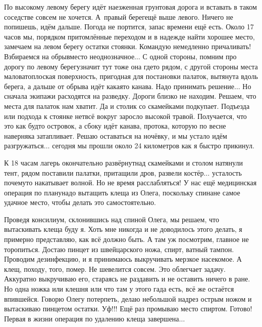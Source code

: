 По высокому левому берегу идёт наезженная грунтовая дорога и вставать в таком соседстве совсем не хочется. А~правый берег\mdash ещё выше левого. Ничего не попишешь, идём дальше. Погода не портится, запас времени ещё есть. Около 17 часов мы, порядком притомлённые переходом и в надежде найти хорошее место, замечаем на левом берегу остатки стоянки. Командую немедленно причаливать! Взбираемся на обрыв\mdash место неоднозначное$\ldots$ С одной стороны, помним про дорогу по левому берегу\mdash значит тут тоже она где\sdash то рядом, с другой стороны места маловато\mdash плоская поверхность, пригодная для постановки палаток, вытянута вдоль берега, а дальше от обрыва идёт какая\sdash то канава. Надо принимать решение$\ldots$ Но сначала экипажи расходятся на разведку. Дороги близко не находим. Решаем, что места для палаток нам хватит. Да и столик со скамейками подкупает. Подъезда или подхода к стоянке нет\mdash всё вокруг заросло высокой травой. Получается, что это как будто островок, а сбоку идёт канава, протока, которую по весне наверняка затапливает. Решаю оставаться на ночёвку, и мы устало идём разгружаться$\ldots$ сегодня мы прошли около 24 километров как я быстро прикинул.

К 18 часам лагерь окончательно развёрнут\mdash над скамейками и столом натянули тент, рядом поставили палатки, притащили дров, развели костёр$\ldots$ усталость почему\sdash то накатывает волной. Но не время расслабляться! У нас ещё медицинская операция по плану\mdash надо вытащить клеща из Олега, поскольку спина\mdash не самое удачное место, чтобы делать это самостоятельно. 

Проведя консилиум, склонившись над спиной Олега, мы решаем, что вытаскивать клеща буду я. Хоть мне никогда и не доводилось этого делать, я примерно представляю, как всё должно быть. А там уж посмотрим, главное не торопиться. Достаю пинцет из швейцарского ножа, спирт, ватный тампон. Проводим дезинфекцию, и я принимаюсь выкручивать мерзкое насекомое. А клещ, походу, того, помер. Не шевелится совсем. Это облегчает задачу. Аккуратно выкручиваю его, стараясь не раздавить и не оставить ничего в ране. Но одна ножка или клешня или что там у этого гада есть, всё же остаётся впившейся. Говорю Олегу потерпеть, делаю небольшой надрез острым ножом и вытаскиваю пинцетом остатки. Уф!!! Ещё раз промываю место спиртом. Готово! Первая в жизни операция по удалению клеща завершена$\ldots$ %

